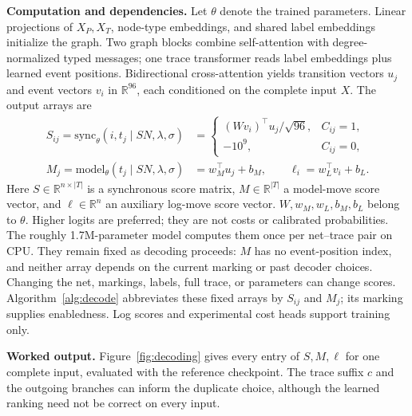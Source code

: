 \documentclass[manuscript,screen,nonacm]{acmart}
\begin{document}
\textbf{Computation and dependencies.} Let $\theta$ denote the trained parameters. Linear projections of $X_P,X_T$, node-type embeddings, and shared label embeddings initialize the graph. Two graph blocks combine self-attention with degree-normalized typed messages; one trace transformer \cite{Vaswani2017} reads label embeddings plus learned event positions. Bidirectional cross-attention yields transition vectors $u_j$ and event vectors $v_i$ in $\mathbb{R}^{96}$, each conditioned on the complete input $X$. The output arrays are
\begin{equation}
\begin{aligned}
 S_{ij}=\mathrm{sync}_\theta(i,t_j\mid SN,\lambda,\sigma)
   &=\begin{cases}(Wv_i)^\top u_j/\sqrt{96},&C_{ij}=1,\\-10^9,&C_{ij}=0,\end{cases}\\
 M_j=\mathrm{model}_\theta(t_j\mid SN,\lambda,\sigma)&=w_M^\top u_j+b_M,\qquad
 \ell_i=w_L^\top v_i+b_L.
\end{aligned}
\label{eq:scores}
\end{equation}
Here $S\in\mathbb{R}^{n\times|T|}$ is a synchronous score matrix, $M\in\mathbb{R}^{|T|}$ a model-move score vector, and $\ell\in\mathbb{R}^n$ an auxiliary log-move score vector. $W,w_M,w_L,b_M,b_L$ belong to $\theta$. Higher logits are preferred; they are not costs or calibrated probabilities. The roughly 1.7M-parameter model computes them once per net--trace pair on CPU. They remain fixed as decoding proceeds: $M$ has no event-position index, and neither array depends on the current marking or past decoder choices. Changing the net, markings, labels, full trace, or parameters can change scores. Algorithm~\ref{alg:decode} abbreviates these fixed arrays by $S_{ij}$ and $M_j$; its marking supplies enabledness. Log scores and experimental cost heads support training only.

\textbf{Worked output.} Figure~\ref{fig:decoding} gives every entry of $S,M,\ell$ for one complete input, evaluated with the reference checkpoint. The trace suffix $c$ and the outgoing branches can inform the duplicate choice, although the learned ranking need not be correct on every input.
\end{document}
